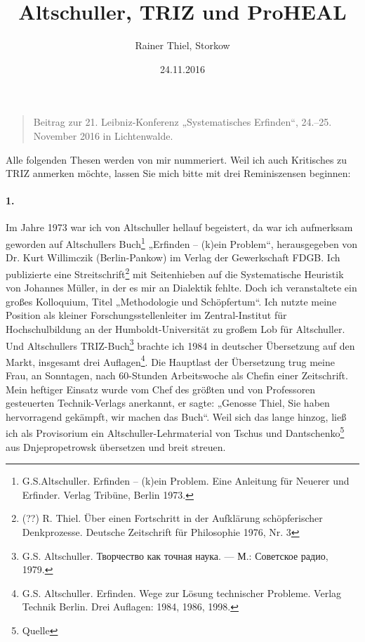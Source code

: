 \documentclass[12pt,a4paper]{article}
\title{Altschuller, TRIZ und ProHEAL}
\author{Rainer Thiel, Storkow}
\date{24.11.2016}
\begin{document}
\maketitle
\begin{quote}
  Beitrag zur 21. Leibniz-Konferenz „Systematisches Erfinden“,
  24.--25. November 2016 in Lichtenwalde.
\end{quote}

Alle folgenden Thesen werden von mir nummeriert. Weil ich auch Kritisches zu
TRIZ anmerken möchte, lassen Sie mich bitte mit drei Reminiszensen beginnen:

\paragraph{1.}
Im Jahre 1973 war ich von Altschuller hellauf begeistert, da war ich
aufmerksam geworden auf Altschullers Buch\footnote{G.S.Altschuller. Erfinden –
  (k)ein Problem. Eine Anleitung für Neuerer und Erfinder. Verlag Tribüne,
  Berlin 1973. } „Erfinden – (k)ein Problem“, herausgegeben von Dr. Kurt
Willimczik (Berlin-Pankow) im Verlag der Gewerkschaft FDGB. Ich publizierte
eine Streitschrift\footnote{(??) R. Thiel. Über einen Fortschritt in der
  Aufklärung schöpferischer Denkprozesse. Deutsche Zeitschrift für Philosophie
  1976, Nr. 3} mit Seitenhieben auf die Systematische Heuristik von Johannes
Müller, in der es mir an Dialektik fehlte. Doch ich veranstaltete ein großes
Kolloquium, Titel „Methodologie und Schöpfertum“. Ich nutzte meine Position
als kleiner Forschungsstellenleiter im Zentral-Institut für Hochschulbildung
an der Humboldt-Universität zu großem Lob für Altschuller.  Und Altschullers
TRIZ-Buch\footnote{G.S. Altschuller. \foreignlanguage{russian}{Творчество как
    точная наука. — М.: Советское радио, 1979.}} brachte ich 1984 in deutscher
Übersetzung auf den Markt, insgesamt drei Auflagen\footnote{G.S. Altschuller.
  Erfinden. Wege zur Lösung technischer Probleme. Verlag Technik Berlin. Drei
  Auflagen: 1984, 1986, 1998.}. Die Hauptlast der Übersetzung trug meine Frau,
an Sonntagen, nach 60-Stunden Arbeitswoche als Chefin einer Zeitschrift. Mein
heftiger Einsatz wurde vom Chef des größten und von Professoren gesteuerten
Technik-Verlags anerkannt, er sagte: „Genosse Thiel, Sie haben hervorragend
gekämpft, wir machen das Buch“. Weil sich das lange hinzog, ließ ich als
Provisorium ein Altschuller-Lehrmaterial von Tschus und
Dantschenko\footnote{Quelle} aus Dnjepropetrowsk übersetzen und breit streuen.
\end{document}
